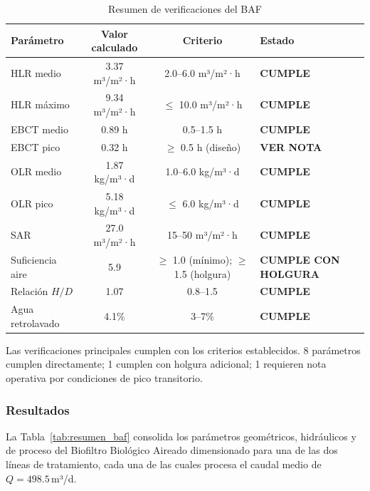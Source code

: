 \documentclass[12pt,a4paper]{article}
\begin{document}
\begin{table}[H]
\centering
\caption{Resumen de verificaciones del BAF}
\label{tab:verif_baf}
\begin{tabular}{lccl}
\toprule
\textbf{Parámetro} & \textbf{Valor calculado} & \textbf{Criterio} & \textbf{Estado} \\
\midrule
HLR medio        & 3.37 m³/m²·h   & 2.0--6.0 m³/m²·h  & \textbf{CUMPLE} \\
HLR máximo       & 9.34 m³/m²·h   & $\leq$ 10.0 m³/m²·h             & \textbf{CUMPLE} \\
EBCT medio       & 0.89 h                   & 0.5--1.5 h                   & \textbf{CUMPLE} \\
EBCT pico        & 0.32 h              & $\geq$ 0.5 h (diseño)             & \textbf{VER NOTA} \\
OLR medio        & 1.87 kg/m³·d   & 1.0--6.0 kg/m³·d & \textbf{CUMPLE} \\
OLR pico         & 5.18 kg/m³·d & $\leq$ 6.0 kg/m³·d          & \textbf{CUMPLE} \\
SAR              & 27.0 m³/m²·h       & 15--50 m³/m²·h  & \textbf{CUMPLE} \\
Suficiencia aire & 5.9      & $\geq$ 1.0 (mínimo); $\geq$ 1.5 (holgura)  & \textbf{CUMPLE CON HOLGURA} \\
Relación $H/D$   & 1.07               & 0.8--1.5          & \textbf{CUMPLE} \\
Agua retrolavado & 4.1\%          & 3--7\%  & \textbf{CUMPLE} \\
\bottomrule
\end{tabular}
\end{table}

Las verificaciones principales cumplen con los criterios establecidos. 8 parámetros cumplen directamente; 1 cumplen con holgura adicional; 1 requieren nota operativa por condiciones de pico transitorio.

\subsubsection{Resultados}

La Tabla~\ref{tab:resumen_baf} consolida los parámetros geométricos, hidráulicos y de proceso del Biofiltro Biológico Aireado dimensionado para una de las dos líneas de tratamiento, cada una de las cuales procesa el caudal medio de $Q = 498.5$\,m³/d.
\end{document}
